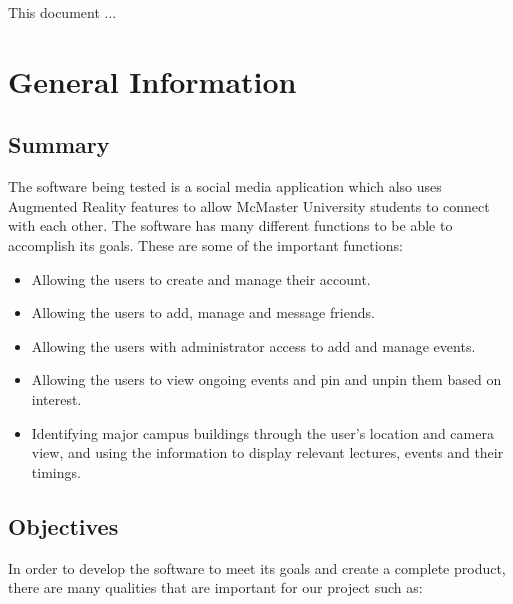 \documentclass[12pt, titlepage]{article}
\begin{document}
\newpage


This document ... 

\section{General Information}

\subsection{Summary}
  
The software being tested is a social media application which also uses Augmented Reality features to allow McMaster University students to connect with each other. The software has many different functions to be able to accomplish its goals. These are some of the important functions:

 \begin{itemize}
     \item  Allowing the users to create and manage their account.

     \item  Allowing the users to add, manage and message friends.

     \item  Allowing the users with administrator access to add and manage events.

     \item  Allowing the users to view ongoing events and pin and unpin them based on interest.

     \item  Identifying major campus buildings through the user's location and camera view, and using the information to display relevant lectures, events and their timings.

 \end{itemize}

 

\subsection{Objectives}

In order to develop the software to meet its goals and create a complete product, there are many qualities that are important for our project such as:
\end{document}
